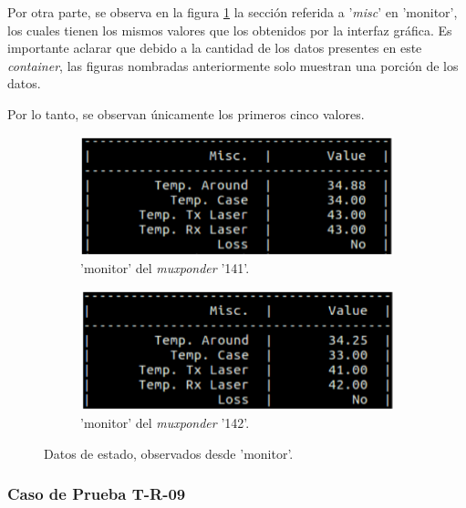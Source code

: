       Por otra parte, se observa en la figura \ref{fig:test8_2} la sección referida a '\textit{misc}' en 'monitor', los cuales tienen los mismos valores que los obtenidos por la interfaz gráfica. Es importante aclarar que debido a la cantidad de los datos presentes en este \textit{container}, las figuras nombradas anteriormente solo muestran una porción de los datos.
      
      Por lo tanto, se observan únicamente los primeros cinco valores.

      \begin{figure}[H]
        \centering
        \begin{subfigure}[b]{0.45\textwidth}
            \centering
            \includegraphics[width=\textwidth]{Figures/test8_2_mux1.png}
            \caption{'monitor' del \textit{muxponder} '141'.}
        \end{subfigure}
        \quad
        \begin{subfigure}[b]{0.45\textwidth}  
            \centering 
            \includegraphics[width=\textwidth]{Figures/test8_2_mux2.png}
            \caption{'monitor' del \textit{muxponder} '142'.}
        \end{subfigure}
        \caption{Datos de estado, observados desde 'monitor'.}
        \label{fig:test8_2}
    \end{figure}

      \subsubsection{Caso de Prueba T-R-09}

